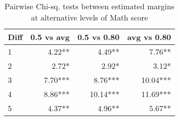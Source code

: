 \begin{table}[htbp]
  \centering
  \caption{Pairwise Chi-sq. tests between estimated margins at alternative levels of Math score}
    \begin{tabular}{lrrr}
    \toprule
    Diff  & \textbf{0.5 vs avg} & \textbf{0.5 vs 0.80} & \textbf{avg vs 0.80} \\
    \midrule
    1     & 4.22** & 4.49** & 7.76** \\
    2     & 2.72* & 2.92* & 3.12* \\
    3     & 7.70*** & 8.76*** & 10.04*** \\
    4     & 8.86*** & 10.14*** & 11.69*** \\
    5     & 4.37** & 4.96** & 5.67** \\
    \bottomrule
    \end{tabular}%
  \label{tab:pairwise_tests}%
\end{table}%
